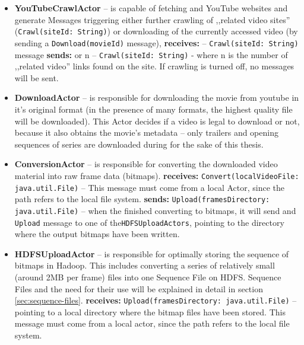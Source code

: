 \begin{itemize}
  \item \textbf{YouTubeCrawlActor} -- is capable of fetching and YouTube websites and generate Messages triggering
                                    either further crawling of ,,related video sites'' (\verb|Crawl(siteId: String)|) or downloading of the 
                                    currently accessed video (by sending a \verb|Download(movieId)| message),
    \subitem  \textbf{receives:}
       -- \verb|Crawl(siteId: String)| message
    \subitem  \textbf{sends:}
       or n -- \verb|Crawl(siteId: String)| - where n is the number of ,,related video'' links found on the site. 
                                                           If crawling is turned off, no messages will be sent.

  \item \textbf{DownloadActor} -- is responsible for downloading the movie from youtube in it's original format (in the presence of many formats, 
                                the highest quality file will be downloaded). This Actor decides if a video is legal to download or not, because it also
                                obtains the movie's metadata -- only trailers and opening sequences of series are downloaded during for the sake of this 
                                thesis.
                                
  \item \textbf{ConversionActor} -- is responsible for converting the downloaded video material into raw frame data (bitmaps).
    \subitem  \textbf{receives:}
      \subsubitem \verb|Convert(localVideoFile: java.util.File)| -- This message must come from a local Actor, since the path refers to the local file system.
    \subitem  \textbf{sends:}
      \subsubitem \verb|Upload(framesDirectory: java.util.File)| -- when the finished converting to bitmaps, it will send and \verb|Upload| 
                                                                    message to one of the\verb|HDFSUploadActors|, pointing to the directory where the 
                                                                    output bitmaps have been written.
                                                                    
  \item \textbf{HDFSUploadActor} -- is responsible for optimally storing the sequence of bitmaps in Hadoop. This includes converting a series of 
                                  relatively small (around 2MB per frame) files into one Sequence File on HDFS. Sequence Files and the need for their use
                                  will be explained in detail in section \ref{sec:sequence-files}.
  \subitem \textbf{receives:}
    \subsubitem \verb|Upload(framesDirectory: java.util.File)| -- pointing to a local directory where the bitmap files have been stored.
                                                                 This message must come from a local actor, since the path refers to the local file system.
\end{itemize}


